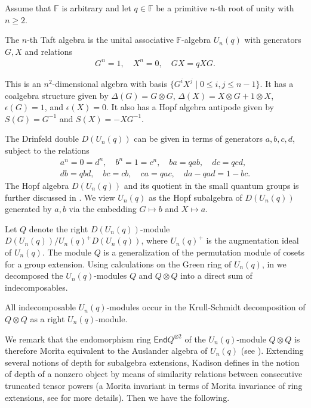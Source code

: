 \documentclass{commat}
\newcommand\q{\quad}
\newcommand{\FF}{\mathbb{F}}
\newcommand\ot{\otimes}
\newcommand\End{\mathsf {End}}
\begin{document}
Assume that $\FF$ is arbitrary and let $q\in \FF$ be a primitive $n$-th root of unity with $n \geq 2$. 

\begin{definition}
	The $n$-th Taft algebra is the unital associative $\FF$-algebra $U_n(q)$ with generators $G,X$ and relations
	\begin{align*}
		G^n = 1,\q X^n = 0, \q GX = qXG.
	\end{align*}
\end{definition}
This is an $n^2$-dimensional algebra with basis $\{ G^i X^j \mid 0\leq i,j\leq n-1 \}$.  It has a coalgebra structure given by $\Delta(G) = G \otimes G$, $\Delta(X) = X \otimes G + 1 \otimes X$, $\epsilon(G) = 1$, and $\epsilon(X) = 0$.  It also has a Hopf algebra antipode given by $S(G) = G^{-1}$ and $S(X) = -XG^{-1}$. 

The Drinfeld double $D(U_n(q))$ can be given in terms of generators $a,b,c,d$, subject to the relations
\begin{align*}
	a^n = 0 = d^n,\q  b^n=1 = c^n,\q  ba = qab,   \q  dc = qcd,\\ db = qbd,\q bc = cb,
	\q ca = qac, \q da - qad = 1 - bc.
\end{align*}
The Hopf algebra $D(U_n(q))$ and its quotient in the small quantum groups is further discussed in \cite[Chapter 9]{cK95}.
We view $U_n(q)$ as the Hopf subalgebra of $D(U_n(q))$ generated by $a,b$ via the embedding $G \mapsto b$ and $X \mapsto a$.


Let $Q$ denote the right $D(U_n(q))$-module $D(U_n(q))/U_n(q)^+D(U_n(q))$, where $U_n(q)^+$ is the augmentation ideal of $U_n(q)$. The module $Q$ is a generalization of the permutation module of cosets for a group extension. Using calculations on the Green ring of $U_n(q)$, in \cite{HKL17} we decomposed the $U_n(q)$-modules $Q$ and $Q\ot Q$ into a direct sum of indecomposables.

\begin{theorem}\label{T:decQQ}
	All indecomposable $U_n(q)$-modules occur in the Krull-Schmidt decomposition of $Q\otimes Q$ as a right $U_n(q)$-module.
\end{theorem}



We remark that the endomorphism ring $\End Q^{\otimes 2}$ of the $U_n(q)$-module $Q \otimes Q$ is therefore Morita equivalent to the Auslander algebra of $U_n(q)$ (see \cite{SY11}). Extending several notions of depth for subalgebra extensions, Kadison defines in \cite{lK14} the notion of depth of a nonzero object by means of similarity relations between consecutive truncated tensor powers (a Morita invariant in terms of Morita invariance of ring extensions, see \cite{lK14, HKL17} for more details). Then we have the following.
\end{document}
